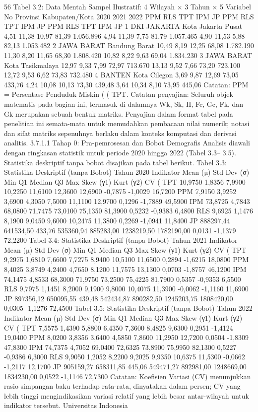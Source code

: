 56
Tabel 3.2: Data Mentah Sampel Ilustratif: 4 Wilayah × 3 Tahun × 5 Variabel
No Provinsi Kabupaten/Kota 2020 2021 2022
PPM RLS TPT IPM JP PPM RLS TPT IPM JP PPM RLS TPT IPM JP
1 DKI
JAKARTA
Kota Jakarta Pusat 4,51 11,38 10,97 81,39 1.056.896 4,94 11,39 7,75 81,79 1.057.465 4,90 11,53 5,88 82,13 1.053.482
2 JAWA
BARAT
Bandung Barat 10,49 8,19 12,25 68,08 1.782.190 11,30 8,20 11,65 68,30 1.808.420 10,82 8,22 9,63 69,04 1.834.230
3 JAWA
BARAT
Kota Tasikmalaya 12,97 9,33 7,99 72,97 713.670 13,13 9,52 7,66 73,20 723.100 12,72 9,53 6,62 73,83 732.480
4 BANTEN Kota Cilegon 3,69 9,87 12,69 73,05 433,76 4,24 10,08 10,13 73,30 439,48 3,64 10,34 8,10 73,95 445,06
Catatan: PPM = Persentase Penduduk Miskin (%
(%
TPT.
Catatan penyajian: Seluruh objek matematis pada bagian ini, termasuk di dalamnya Wk,
Sk, H, Fc, Gc, Fk, dan Gk merupakan sebuah bentuk matriks. Penyajian dalam format
tabel pada penelitian ini semata-mata untuk memudahkan pembacaan nilai numerik; notasi
dan sifat matriks sepenuhnya berlaku dalam konteks komputasi dan derivasi analitis.
3.7.1.1 Tahap 0: Pra-pemrosesan dan Bobot Demografis
Analisis diawali dengan ringkasan statistik untuk periode 2020 hingga 2022 (Tabel 3.3–
3.5). Statistika deskriptif tanpa bobot disajikan pada tabel berikut.
Tabel 3.3: Statistika Deskriptif (tanpa Bobot) Tahun 2020
Indikator Mean (µ) Std Dev (σ) Min Q1 Median Q3 Max Skew (γ1) Kurt (γ2) CV (%
TPT 10,9750 1,8356 7,9900 10,2250 11,6100 12,3600 12,6900 -0,7875 -1,0029 16,7200
PPM 7,9150 3,9252 3,6900 4,3050 7,5000 11,1100 12,9700 0,1296 -1,7889 49,5900
IPM 73,8725 4,7843 68,0800 71,7475 73,0100 75,1350 81,3900 0,5232 -0,9383 6,4800
RLS 9,6925 1,1476 8,1900 9,0450 9,6000 10,2475 11,3800 0,2269 -1,0941 11,8400
JP 888297,44 641534,50 433,76 535360,94 885283,00 1238219,50 1782190,00 0,0131 -1,1379 72,2200
Tabel 3.4: Statistika Deskriptif (tanpa Bobot) Tahun 2021
Indikator Mean (µ) Std Dev (σ) Min Q1 Median Q3 Max Skew (γ1) Kurt (γ2) CV (%
TPT 9,2975 1,6810 7,6600 7,7275 8,9400 10,5100 11,6500 0,2894 -1,6215 18,0800
PPM 8,4025 3,8749 4,2400 4,7650 8,1200 11,7575 13,1300 0,0703 -1,8757 46,1200
IPM 74,1475 4,8533 68,3000 71,9750 73,2500 75,4225 81,7900 0,5357 -0,9353 6,5500
RLS 9,7975 1,1451 8,2000 9,1900 9,8000 10,4075 11,3900 -0,0062 -1,1160 11,6900
JP 897356,12 650095,55 439,48 542434,87 890282,50 1245203,75 1808420,00 0,0305 -1,1276 72,4500
Tabel 3.5: Statistika Deskriptif (tanpa Bobot) Tahun 2022
Indikator Mean (µ) Std Dev (σ) Min Q1 Median Q3 Max Skew (γ1) Kurt (γ2) CV (%
TPT 7,5575 1,4390 5,8800 6,4350 7,3600 8,4825 9,6300 0,2951 -1,4124 19,0400
PPM 8,0200 3,8356 3,6400 4,5850 7,8600 11,2950 12,7200 0,0504 -1,8309 47,8300
IPM 74,7375 4,7052 69,0400 72,6325 73,8900 75,9950 82,1300 0,5227 -0,9386 6,3000
RLS 9,9050 1,2052 8,2200 9,2025 9,9350 10,6375 11,5300 -0,0662 -1,2117 12,1700
JP 905159,27 658311,85 445,06 549471,27 892981,00 1248669,00 1834230,00 0,0522 -1,1146 72,7300
Catatan: Koefisien Variasi (CV) menunjukkan rasio simpangan baku terhadap rata-rata,
dinyatakan dalam persen; CV yang lebih tinggi mengindikasikan variasi relatif yang lebih
besar antar-wilayah untuk indikator tersebut.
Universitas Indonesia

